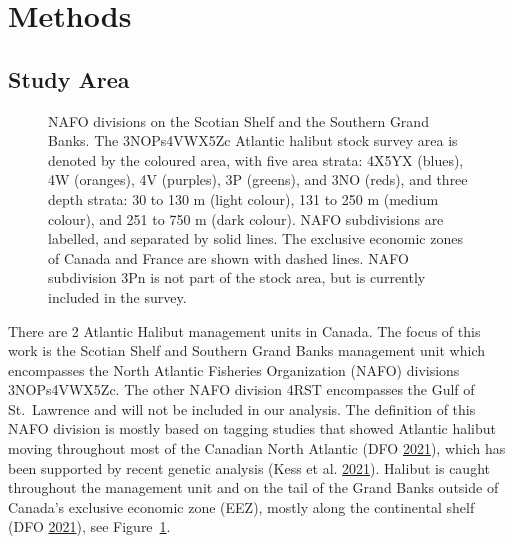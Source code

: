 \documentclass[12pt]{article}\usepackage[]{graphicx}\usepackage[]{color}
\begin{document}
\hypertarget{methods}{%
\section{Methods}\label{methods}}

\hypertarget{study-area}{%
\subsection{Study Area}\label{study-area}}
\begin{figure}[htb]

{\centering {} 

}

\caption{NAFO divisions on the Scotian Shelf and the Southern Grand Banks. The 3NOPs4VWX5Zc Atlantic halibut stock survey area is denoted by the coloured area, with five area strata: 4X5YX (blues), 4W (oranges), 4V (purples), 3P (greens), and 3NO (reds), and three depth strata: 30 to 130 m (light colour), 131 to 250 m (medium colour), and 251 to 750 m (dark colour). NAFO subdivisions are labelled, and separated by solid lines. The exclusive economic zones of Canada and France are shown with dashed lines. NAFO subdivision 3Pn is not part of the stock area, but is currently included in the survey.}\label{fig:nafo-strat}
\end{figure}
There are 2 Atlantic Halibut management units in Canada. The focus of this work is the Scotian Shelf and Southern Grand Banks management unit which encompasses the North Atlantic Fisheries Organization (NAFO) divisions 3NOPs4VWX5Zc. The other NAFO division 4RST encompasses the Gulf of St.~Lawrence and will not be included in our analysis. The definition of this NAFO division is mostly based on tagging studies that showed Atlantic halibut moving throughout most of the Canadian North Atlantic (DFO \protect\hyperlink{ref-DFO2021}{2021}), which has been supported by recent genetic analysis (Kess et al. \protect\hyperlink{ref-Kess2021}{2021}). Halibut is caught throughout the management unit and on the tail of the Grand Banks outside of Canada's exclusive economic zone (EEZ), mostly along the continental shelf (DFO \protect\hyperlink{ref-DFO2021}{2021}), see Figure~\ref{fig:nafo-strat}.
\end{document}
